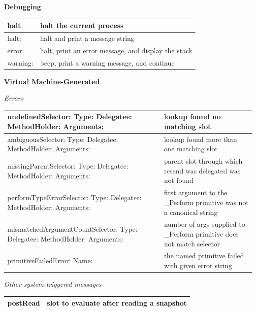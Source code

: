 \documentclass[letterpaper,10pt,english]{sphinxmanual}
\begin{document}
\textbf{Debugging}

\begin{tabulary}{\linewidth}{p{5cm} p{10cm}}
\hline

halt
 & 
halt the current process
\\\hline

halt:
 & 
halt and print a message string
\\\hline

error:
 & 
halt, print an error message, and display the stack
\\\hline

warning:
 & 
beep, print a warning message, and continue
\\\hline
\end{tabulary}


\textbf{Virtual Machine-Generated}

\emph{Errors}

\begin{tabulary}{\linewidth}{p{5cm} p{10cm}}
\hline

undefinedSelector: Type: Delegatee: MethodHolder: Arguments:
 & 
lookup found no matching slot
\\\hline

ambiguousSelector: Type: Delegatee: MethodHolder: Arguments:
 & 
lookup found more than one matching slot
\\\hline

missingParentSelector: Type: Delegatee: MethodHolder: Arguments:
 & 
parent slot through which resend was delegated was not found
\\\hline

performTypeErrorSelector: Type: Delegatee: MethodHolder: Arguments:
 & 
first argument to the \_Perform primitive was not a canonical string
\\\hline

mismatchedArgumentCountSelector: Type: Delegatee: MethodHolder: Arguments:
 & 
number of args supplied to \_Perform primitive does not match selector
\\\hline

primitiveFailedError: Name:
 & 
the named primitive failed with given error string
\\\hline
\end{tabulary}


\emph{Other system-triggered messages}

\begin{tabulary}{\linewidth}{p{5cm} p{10cm}}
\hline

postRead
 & 
slot to evaluate after reading a snapshot
\\\hline
\end{tabulary}
\end{document}

